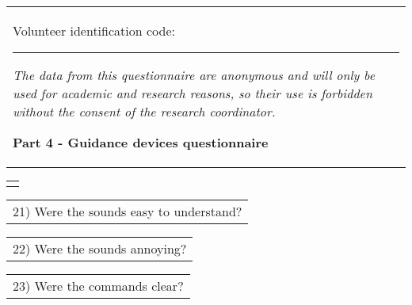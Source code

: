 \begin{table}[!thb]
    \begin{tabular}{m{1\linewidth}}

        {\color{gray}

        Volunteer identification code: \rule{1in}{.2mm}
        
        \textit{The data from this questionnaire are anonymous and will only be used for academic and research reasons, so their use is forbidden without the consent of the research coordinator.}
        }
        
        \begin{center}
        \textbf{Part 4 - Guidance devices questionnaire}
        \end{center}
        
    \end{tabular}
%
    \begin{tabular}{>{\centering\arraybackslash}m{1\linewidth}}
        {\large TESTE 4 -MIXTURE}
    \end{tabular}


    \begin{tabular}{m{1\linewidth}}
        \vspace{1ex}
        21)	Were the sounds easy to understand?
    \end{tabular}

    
    

    \begin{tabular}{m{1\linewidth}}
        \vspace{1ex}
        22)	Were the sounds annoying?
    \end{tabular}

    
    

    \begin{tabular}{m{1\linewidth}}
        \vspace{1ex}
        23)	Were the commands clear?
    \end{tabular}

    
    


\end{table}
